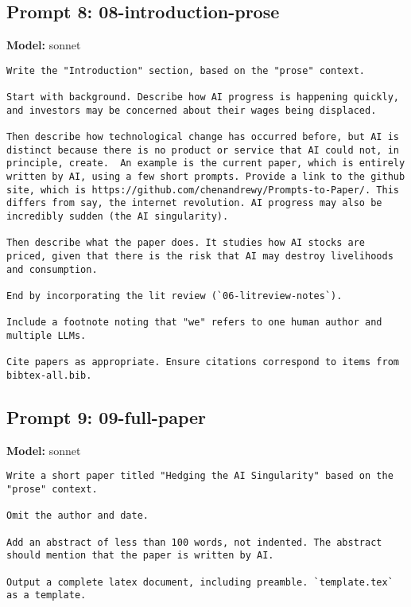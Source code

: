 \subsection*{Prompt 8: 08-introduction-prose}
\textbf{Model:} sonnet
\vspace{0.5em}
\begin{lstlisting}[language=text,breaklines=true,frame=single]
Write the "Introduction" section, based on the "prose" context. 

Start with background. Describe how AI progress is happening quickly, and investors may be concerned about their wages being displaced.       

Then describe how technological change has occurred before, but AI is distinct because there is no product or service that AI could not, in principle, create.  An example is the current paper, which is entirely written by AI, using a few short prompts. Provide a link to the github site, which is https://github.com/chenandrewy/Prompts-to-Paper/. This differs from say, the internet revolution. AI progress may also be incredibly sudden (the AI singularity).

Then describe what the paper does. It studies how AI stocks are priced, given that there is the risk that AI may destroy livelihoods and consumption. 

End by incorporating the lit review (`06-litreview-notes`).

Include a footnote noting that "we" refers to one human author and multiple LLMs.

Cite papers as appropriate. Ensure citations correspond to items from bibtex-all.bib.      

\end{lstlisting}
\vspace{1em}
\subsection*{Prompt 9: 09-full-paper}
\textbf{Model:} sonnet
\vspace{0.5em}
\begin{lstlisting}[language=text,breaklines=true,frame=single]
Write a short paper titled "Hedging the AI Singularity" based on the "prose" context.

Omit the author and date.

Add an abstract of less than 100 words, not indented. The abstract should mention that the paper is written by AI.

Output a complete latex document, including preamble. `template.tex` as a template.

\end{lstlisting}
\vspace{1em}